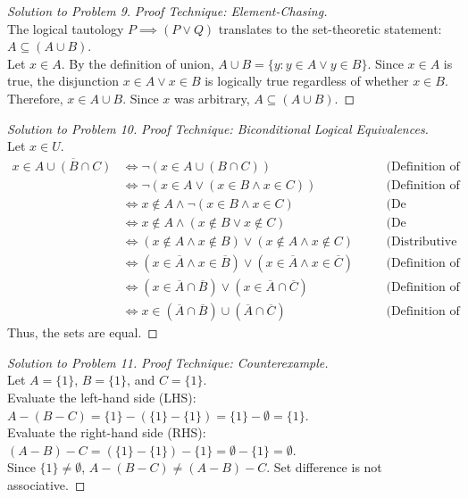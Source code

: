 \documentclass[12pt]{article}
\theoremstyle{definition}
\begin{document}
\begin{proof}[Solution to Problem 9]
\textit{Proof Technique: Element-Chasing.} \\
The logical tautology $P \implies (P \lor Q)$ translates to the set-theoretic statement: $A \subseteq (A \cup B)$. \\
Let $x \in A$. By the definition of union, $A \cup B = \{y : y \in A \lor y \in B\}$. Since $x \in A$ is true, the disjunction $x \in A \lor x \in B$ is logically true regardless of whether $x \in B$. Therefore, $x \in A \cup B$. Since $x$ was arbitrary, $A \subseteq (A \cup B)$.
\end{proof}

\begin{proof}[Solution to Problem 10]
\textit{Proof Technique: Biconditional Logical Equivalences.} \\
Let $x \in U$.
\begin{align*}
x \in \overline{A \cup (B \cap C)} &\iff \neg(x \in A \cup (B \cap C)) \quad &&\text{(Definition of Complement)} \\
&\iff \neg(x \in A \lor (x \in B \land x \in C)) \quad &&\text{(Definition of Union and Intersection)} \\
&\iff x \notin A \land \neg(x \in B \land x \in C) \quad &&\text{(De Morgan's Law of Logic)} \\
&\iff x \notin A \land (x \notin B \lor x \notin C) \quad &&\text{(De Morgan's Law of Logic)} \\
&\iff (x \notin A \land x \notin B) \lor (x \notin A \land x \notin C) \quad &&\text{(Distributive Law of Logic)} \\
&\iff (x \in \overline{A} \land x \in \overline{B}) \lor (x \in \overline{A} \land x \in \overline{C}) \quad &&\text{(Definition of Complement)} \\
&\iff (x \in \overline{A} \cap \overline{B}) \lor (x \in \overline{A} \cap \overline{C}) \quad &&\text{(Definition of Intersection)} \\
&\iff x \in (\overline{A} \cap \overline{B}) \cup (\overline{A} \cap \overline{C}) \quad &&\text{(Definition of Union)}
\end{align*}
Thus, the sets are equal.
\end{proof}

\begin{proof}[Solution to Problem 11]
\textit{Proof Technique: Counterexample.} \\
Let $A = \{1\}$, $B = \{1\}$, and $C = \{1\}$. \\
Evaluate the left-hand side (LHS): $A - (B - C) = \{1\} - (\{1\} - \{1\}) = \{1\} - \emptyset = \{1\}$. \\
Evaluate the right-hand side (RHS): $(A - B) - C = (\{1\} - \{1\}) - \{1\} = \emptyset - \{1\} = \emptyset$. \\
Since $\{1\} \neq \emptyset$, $A - (B - C) \neq (A - B) - C$. Set difference is not associative.
\end{proof}
\end{document}
